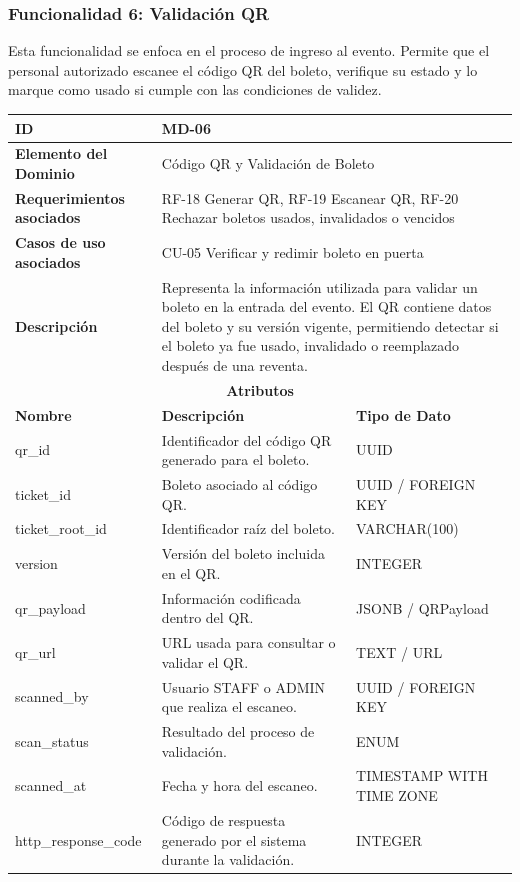 \documentclass[12pt,letterpaper]{article}
\begin{document}
\subsubsection{Funcionalidad 6: Validación QR}
Esta funcionalidad se enfoca en el proceso de ingreso al evento. Permite que el personal autorizado escanee el código QR del boleto, verifique su estado y lo marque como usado si cumple con las condiciones de validez.
\begin{table}[H]
\centering
\scriptsize
\renewcommand{\arraystretch}{1.12}
\setlength{\tabcolsep}{4pt}

\begin{tabularx}{\textwidth}{|p{3.2cm}|X|p{4.2cm}|}
\hline
\textbf{ID} & MD-06 & \\ \hline

\textbf{Elemento del Dominio} & 
\multicolumn{2}{X|}{Código QR y Validación de Boleto} \\ \hline

\textbf{Requerimientos asociados} & 
\multicolumn{2}{X|}{RF-18 Generar QR, RF-19 Escanear QR, RF-20 Rechazar boletos usados, invalidados o vencidos} \\ \hline

\textbf{Casos de uso asociados} & 
\multicolumn{2}{X|}{CU-05 Verificar y redimir boleto en puerta} \\ \hline

\textbf{Descripción} & 
\multicolumn{2}{X|}{Representa la información utilizada para validar un boleto en la entrada del evento. El QR contiene datos del boleto y su versión vigente, permitiendo detectar si el boleto ya fue usado, invalidado o reemplazado después de una reventa.} \\ \hline

\multicolumn{3}{|c|}{\textbf{Atributos}} \\ \hline

\textbf{Nombre} & \textbf{Descripción} & \textbf{Tipo de Dato} \\ \hline

qr\_id & Identificador del código QR generado para el boleto. & UUID \\ \hline
ticket\_id & Boleto asociado al código QR. & UUID / FOREIGN KEY \\ \hline
ticket\_root\_id & Identificador raíz del boleto. & VARCHAR(100) \\ \hline
version & Versión del boleto incluida en el QR. & INTEGER \\ \hline
qr\_payload & Información codificada dentro del QR. & JSONB / QRPayload \\ \hline
qr\_url & URL usada para consultar o validar el QR. & TEXT / URL \\ \hline
scanned\_by & Usuario STAFF o ADMIN que realiza el escaneo. & UUID / FOREIGN KEY \\ \hline
scan\_status & Resultado del proceso de validación. & ENUM \\ \hline
scanned\_at & Fecha y hora del escaneo. & TIMESTAMP WITH TIME ZONE \\ \hline
http\_response\_code & Código de respuesta generado por el sistema durante la validación. & INTEGER \\ \hline


\end{tabularx}
\end{table}
\end{document}
